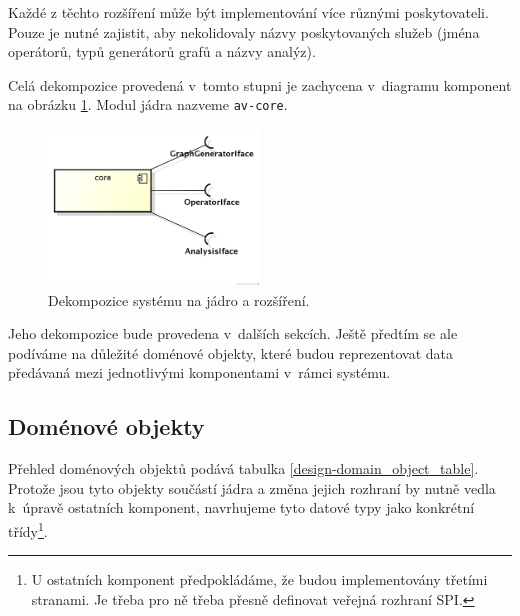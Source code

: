 Každé z těchto rozšíření může být implementování více různými poskytovateli. Pouze je nutné zajistit, aby nekolidovaly názvy poskytovaných služeb (jména operátorů, typů generátorů grafů a názvy analýz).

Celá dekompozice provedená v~tomto stupni je zachycena v~diagramu komponent na obrázku \ref{design-modules}. Modul jádra nazveme \verb+av-core+.
\begin{figure}[h!]
  \centering
  \includegraphics[width=0.5\textwidth]{./uml/archval_module_cmp.png}
  \caption{Dekompozice systému na jádro a rozšíření.\label{design-modules}}
\end{figure}
Jeho dekompozice bude provedena v~dalších sekcích. Ještě předtím se ale podíváme na důležité doménové objekty, které budou reprezentovat data předávaná mezi jednotlivými komponentami v~rámci systému.

\subsection{Doménové objekty}
\label{design-domain_objects}

Přehled doménových objektů podává tabulka \ref{design-domain_object_table}. Protože jsou tyto objekty součástí jádra a změna jejich rozhraní by nutně vedla k~úpravě ostatních komponent, navrhujeme tyto datové typy jako konkrétní třídy\footnote{U ostatních komponent předpokládáme, že budou implementovány třetími stranami. Je třeba pro ně třeba přesně definovat veřejná rozhraní SPI.}.

